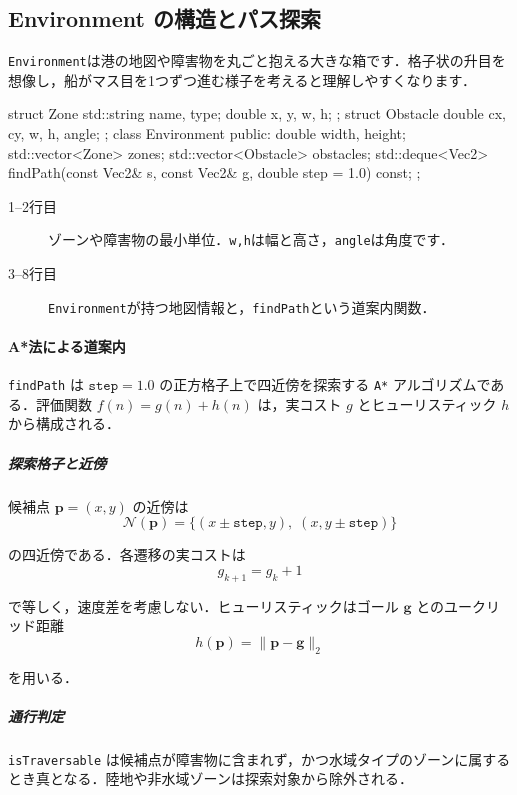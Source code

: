 \documentclass[10pt,letterpaper]{jsarticle}
\begin{document}
\subsection{Environment の構造とパス探索}\label{app:environment}
\texttt{Environment}は港の地図や障害物を丸ごと抱える大きな箱です．格子状の升目を想像し，船がマス目を1つずつ進む様子を考えると理解しやすくなります．

\begin{cppcode}
struct Zone { std::string name, type; double x, y, w, h; };
struct Obstacle { double cx, cy, w, h, angle; };
class Environment {
public:
    double width, height;
    std::vector<Zone> zones;
    std::vector<Obstacle> obstacles;
    std::deque<Vec2> findPath(const Vec2& s, const Vec2& g, double step = 1.0) const;
};
\end{cppcode}
\begin{description}
  \item[1--2行目] ゾーンや障害物の最小単位．\texttt{w,h}は幅と高さ，\texttt{angle}は角度です．
  \item[3--8行目] \texttt{Environment}が持つ地図情報と，\texttt{findPath}という道案内関数．
\end{description}

\paragraph{A*法による道案内}
\texttt{findPath} は $\texttt{step}=1.0$ の正方格子上で四近傍を探索する \texttt{A*} アルゴリズムである．評価関数 $f(n)=g(n)+h(n)$ は，実コスト $g$ とヒューリスティック $h$ から構成される．

\subparagraph{探索格子と近傍}
候補点 $\bm{p}=(x,y)$ の近傍は
\begin{equation}
  \mathcal{N}(\bm{p}) = \{(x\pm \texttt{step}, y),\; (x, y\pm \texttt{step})\}
\end{equation}

の四近傍である．各遷移の実コストは
\begin{equation}
  g_{k+1} = g_k + 1
\end{equation}

で等しく，速度差を考慮しない．ヒューリスティックはゴール $\bm{g}$ とのユークリッド距離
\begin{equation}
  h(\bm{p}) = \lVert \bm{p} - \bm{g} \rVert_2
\end{equation}

を用いる．

\subparagraph{通行判定}
\texttt{isTraversable} は候補点が障害物に含まれず，かつ水域タイプのゾーンに属するとき真となる．陸地や非水域ゾーンは探索対象から除外される．
\end{document}
